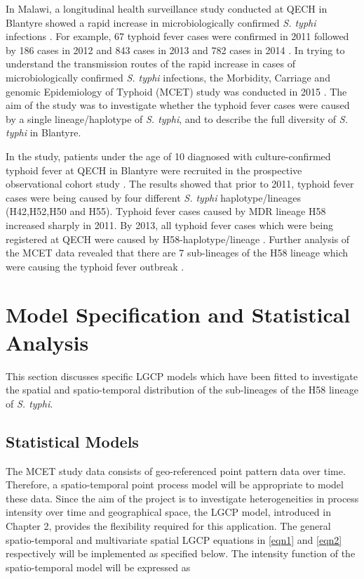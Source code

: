 In Malawi, a longitudinal health surveillance study conducted at QECH in Blantyre showed a rapid increase in microbiologically confirmed \textit{S. typhi} infections \citep{Feasey:2015}. For example, 67 typhoid fever cases were confirmed in 2011 followed by 186 cases in 2012 and 843 cases in 2013 and 782 cases in 2014 \citep{Feasey:2015}. In trying to understand the transmission routes of the rapid increase in cases of microbiologically confirmed \textit{S. typhi} infections, the Morbidity, Carriage and genomic Epidemiology of Typhoid (MCET) study was conducted in 2015 \citep{Feasey:2015}. The aim of the study was to investigate whether the typhoid fever cases were caused by a single lineage/haplotype of \textit{S. typhi}, and to describe the full diversity of \textit{S. typhi} in Blantyre.

In the study, patients under the age of 10 diagnosed with culture-confirmed typhoid fever at QECH in Blantyre were recruited in the prospective observational cohort study \citep{Feasey:2015}. The results showed that prior to 2011, typhoid fever cases were being caused by four different \textit{S. typhi} haplotype/lineages (H42,H52,H50 and H55). Typhoid fever cases caused by MDR lineage H58 increased sharply in 2011. By 2013, all typhoid fever cases which were being registered at QECH were caused by H58-haplotype/lineage \citep{Feasey:2015}. Further analysis of the MCET data revealed that there are 7 sub-lineages of the H58 lineage which were causing the typhoid fever outbreak \citep{Gauld:2022}.

\section{Model Specification and Statistical Analysis}

This section discusses specific LGCP models which have been fitted to investigate the spatial and spatio-temporal distribution of the sub-lineages of the H58 lineage of \textit{S. typhi}.

\subsection{Statistical Models}

The MCET study data consists of geo-referenced point pattern data over time. Therefore, a spatio-temporal point process model will be appropriate to model these data. Since the aim of the project is to investigate heterogeneities in process intensity over time and geographical space, the LGCP model, introduced in Chapter 2, provides the flexibility required for this application. The general spatio-temporal and multivariate spatial LGCP equations in  \ref{eqn1} and \ref{eqn2} respectively will be implemented as specified below. The intensity function of the spatio-temporal model will be expressed as

